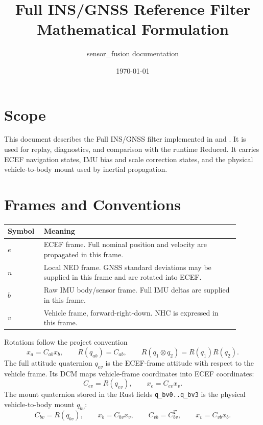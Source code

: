 \documentclass[11pt]{article}
\title{Full INS/GNSS Reference Filter Mathematical Formulation}
\author{sensor\_fusion documentation}
\date{\today}
\newcommand{\T}{^{T}}
\begin{document}
\maketitle
\tableofcontents
\newpage

\section{Scope}

This document describes the Full INS/GNSS filter implemented in
 and . It is used
for replay, diagnostics, and comparison with the runtime Reduced. It carries
ECEF navigation states, IMU bias and scale correction states, and the physical
vehicle-to-body mount used by inertial propagation.

\section{Frames and Conventions}

\begin{longtable}{>{\raggedright\arraybackslash}p{0.12\linewidth} >{\raggedright\arraybackslash}p{0.78\linewidth}}
\toprule
\textbf{Symbol} & \textbf{Meaning} \\
\midrule
\(e\) & ECEF frame. Full nominal position and velocity are propagated in this frame. \\
\(n\) & Local NED frame. GNSS standard deviations may be supplied in this frame and are rotated into ECEF. \\
\(b\) & Raw IMU body/sensor frame. Full IMU deltas are supplied in this frame. \\
\(v\) & Vehicle frame, forward-right-down. NHC is expressed in this frame. \\
\bottomrule
\end{longtable}

Rotations follow the project convention
\begin{equation}
  x_a=C_{ab}x_b,\qquad R(q_{ab})=C_{ab},\qquad
  R(q_1\otimes q_2)=R(q_1)R(q_2).
\end{equation}
The full attitude quaternion \(q_{ev}\) is the ECEF-frame attitude with respect
to the vehicle frame. Its DCM maps vehicle-frame coordinates into ECEF
coordinates:
\begin{equation}
  C_{ev}=R(q_{ev}),\qquad x_e=C_{ev}x_v .
\end{equation}
The mount quaternion stored in the Rust fields \texttt{q_bv0..q_bv3} is the
physical vehicle-to-body mount \(q_{bv}\):
\begin{equation}
  C_{bv}=R(q_{bv}),\qquad x_b=C_{bv}x_v,\qquad
  C_{vb}=C_{bv}\T,\qquad x_v=C_{vb}x_b .
\end{equation}
\end{document}
